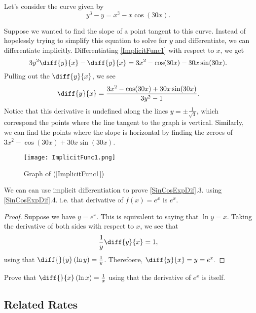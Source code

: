 \begin{exmp}
  Let's consider the curve given by
\begin{equation}\label{ImplicitFunc1}
  y^3-y = x^3-x\cos(30x).
\end{equation}

Suppose we wanted to find the slope of a point tangent to this curve. Instead of hopelessly trying to simplify this equation to solve for $y$ and differentiate, we can differentiate implicitly. Differentiating \eqref{ImplicitFunc1} with respect to $x$, we get \[
3y^2\diff{y}{x}-\diff{y}{x}=3x^2-\cos(30x)-30x\sin(30x).
\]
Pulling out the $\diff{y}{x}$, we see
\[
\diff{y}{x}=\frac{3x^2-\cos(30x)+30x\sin(30x)}{3y^2-1}.
\]
Notice that this derivative is undefined along the lines $y=\pm\frac{1}{\sqrt{3}}$, which correspond the points where the line tangent to the graph is vertical. Similarly, we can find the points where the slope is horizontal by finding the zeroes of $3x^2-\cos(30x)+30x\sin(30x)$.


\begin{figure}
  \centering
  \texttt{[image: ImplicitFunc1.png]}
  \caption{Graph of (\ref{ImplicitFunc1})}
\end{figure}
\end{exmp}

We can can use implicit differentiation to prove \cref{SinCosExpDif}.3. using \cref{SinCosExpDif}.4.  i.e. that derivative of $f(x)=e^x$ is $e^x$.
\begin{proof}
Suppose we have $y=e^x$. This is equivalent to saying that $\ln y = x$.
Taking the derivative of both sides with respect to $x$, we see that
\[
\frac{1}{y}\diff{y}{x}=1,
\]
using that $\diff{}{y}\left( \ln y \right) = \frac{1}{y}$. Therefoere,
$\diff{y}{x}=y=e^x$.
\end{proof}

\begin{exer}
  Prove that $\diff{}{x}\left( \ln x \right) = \frac{1}{x}$ using that the derivative of $e^x$ is itself.
\end{exer}

\subsection{Related Rates}
